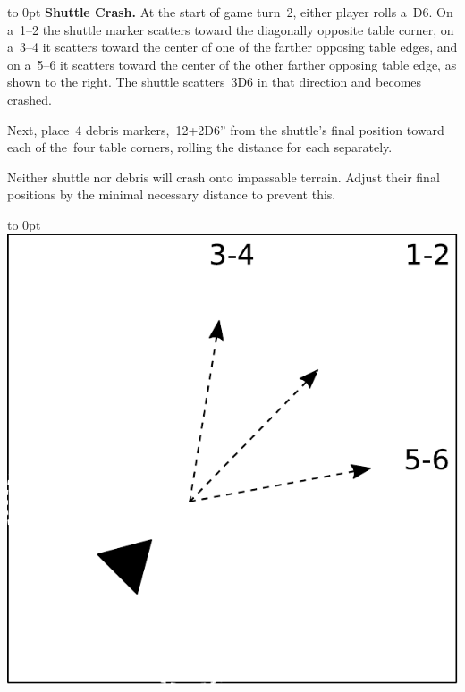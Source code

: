 \begin{missionrules}
\vspace{-1.5em}%
\noindent%
  \begin{minipage}[t]{\linewidth-(1.75in+1em)}\vbox to 0pt{}
    \textbf{Shuttle Crash.} At the start of game turn~2, either player
    rolls a~D6.  On a~1--2 the shuttle marker scatters toward the
    diagonally opposite table corner, on a~3--4 it scatters toward the
    center of one of the farther opposing table edges, and on a~5--6
    it scatters toward the center of the other farther opposing table
    edge, as shown to the right. The shuttle scatters~3D6 in that
    direction and becomes crashed.

    \smallskip\hspace{1em} Next, place~4 debris markers,~12+2D6'' from
    the shuttle's final position toward each of the~four table
    corners, rolling the distance for each separately.

    \smallskip\hspace{1em} Neither shuttle nor debris will crash onto
    impassable terrain.  Adjust their final positions by the minimal
    necessary distance to prevent this.
  \end{minipage}\hfill
  \begin{minipage}[t]{1.75in}\vbox to 0pt{}
  \includegraphics[width=\linewidth]{missions/shuttle-scatter}
  \end{minipage}


\end{missionrules}
